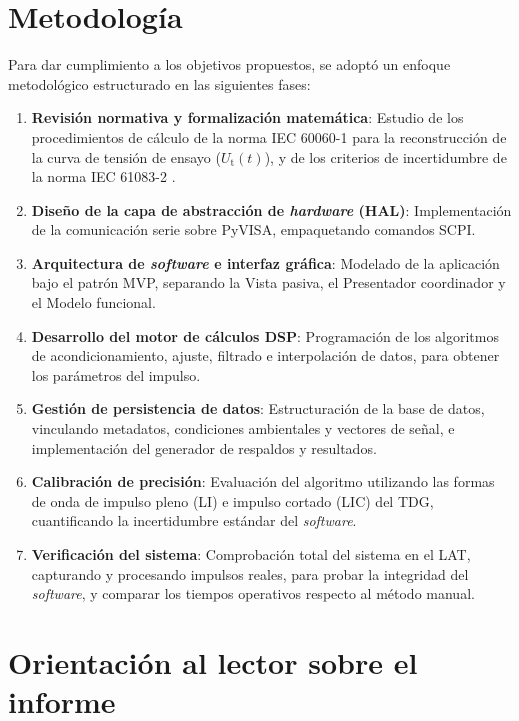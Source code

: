 \section{Metodología}
\label{sec:metodologia}
\vspace{3\baselineskip}

Para dar cumplimiento a los objetivos propuestos, se adoptó un enfoque metodológico estructurado en las siguientes fases:

\begin{enumerate}
    \item \textbf{Revisión normativa y formalización matemática}: Estudio de los procedimientos de cálculo de la norma IEC 60060-1 \cite{iec60060_1} para la reconstrucción de la curva de tensión de ensayo ($U_\text{t}(t)$), y de los criterios de incertidumbre de la norma IEC 61083-2 \cite{iec61083_2}.
    \item \textbf{Diseño de la capa de abstracción de \emph{hardware} (HAL)}: Implementación de la comunicación serie sobre PyVISA, empaquetando comandos SCPI.
    \item \textbf{Arquitectura de \emph{software} e interfaz gráfica}: Modelado de la aplicación bajo el patrón MVP, separando la Vista pasiva, el Presentador coordinador y el Modelo funcional.
    \item \textbf{Desarrollo del motor de cálculos DSP}: Programación de los algoritmos de acondicionamiento, ajuste, filtrado e interpolación de datos, para obtener los parámetros del impulso.
    \item \textbf{Gestión de persistencia de datos}: Estructuración de la base de datos, vinculando metadatos, condiciones ambientales y vectores de señal, e implementación del generador de respaldos y resultados.
    \item \textbf{Calibración de precisión}: Evaluación del algoritmo utilizando las formas de onda de impulso pleno (LI) e impulso cortado (LIC) del TDG, cuantificando la incertidumbre estándar del \emph{software}.
    \item \textbf{Verificación del sistema}: Comprobación total del sistema en el LAT, capturando y procesando impulsos reales, para probar la integridad del \emph{software}, y comparar los tiempos operativos respecto al método manual.
\end{enumerate}

\section{Orientación al lector sobre el informe}
\label{sec:orientacion_lector}
\vspace{3\baselineskip}

